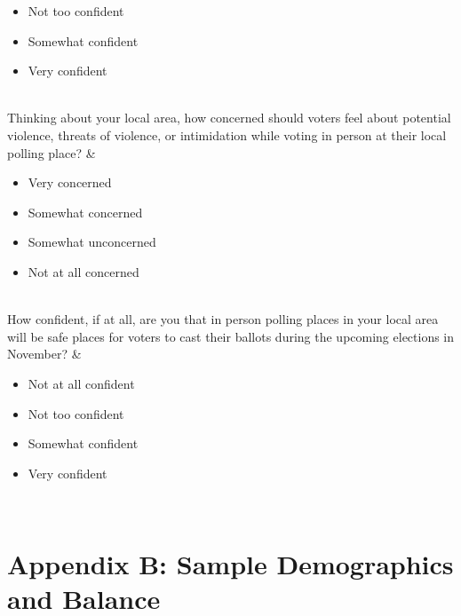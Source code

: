 \documentclass[
  12pt,
  letterpaper,
]{article}
\begin{document}
\begin{table}[H]
{\begin{tblr}[         %
]
\begin{itemize}
\item Not too confident

\item Somewhat confident

\item Very confident

\end{itemize}\endminipage \\
Thinking about your local area, how concerned should voters feel about potential violence, threats of violence, or intimidation while voting in person at their local polling place? & \minipage{\textwidth}\begin{itemize}
\item Very concerned

\item Somewhat concerned

\item Somewhat unconcerned

\item Not at all concerned

\end{itemize}\endminipage \\
How confident, if at all, are you that in person polling places in your local area will be safe places for voters to cast their ballots during the upcoming elections in November? & \minipage{\textwidth}\begin{itemize}
\item Not at all confident

\item Not too confident

\item Somewhat confident

\item Very confident

\end{itemize}\endminipage \\
\bottomrule
\end{tblr}

}

\end{table}%

\newpage{}

\section{Appendix B: Sample Demographics and
Balance}\label{appendix-b-sample-demographics-and-balance}
\end{document}
